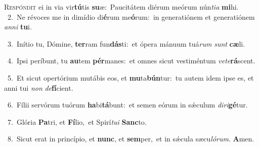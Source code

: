 \lettrine{\initial\textcolor{\initialcolor}{R}}{espóndit} ei in via vir\-\textbf{tú}\-tis \textbf{su}\-æ:~\star Paucitátem diérum meórum nún\-\textit{ti}\-\textit{a} \textbf{mi}\-hi.\\
{\numbfont\textcolor{\numbcolor}{~2.}}~Ne révoces me in dimídio di\-\textbf{é}\-rum me\-\textbf{ó}\-rum:~\star in generatiónem et generatiónem \textit{an}\-\textit{ni} \textbf{tu}\-i.\par
{\numbfont\textcolor{\numbcolor}{~3.}}~Inítio tu, Dómine, \textbf{ter}\-ram fun\-\textbf{dás}\-ti:~\star et ópera mánuum tuá\textit{rum} \textit{sunt} \textbf{cæ}\-li.\par
{\numbfont\textcolor{\numbcolor}{~4.}}~Ipsi períbunt, tu \textbf{au}\-tem \textbf{pér}\-manes:~\star et omnes sicut vestiméntum \textit{ve}\-\textit{te}\textbf{rá}scent.\par
{\numbfont\textcolor{\numbcolor}{~5.}}~Et sicut opertórium mutábis eos, et \textbf{mu}\-ta\-\textbf{bún}\-tur:~\star tu autem idem ipse es, et anni tui \textit{non} \textit{de}\-\textbf{fí}cient.\par
{\numbfont\textcolor{\numbcolor}{~6.}}~Fílii servórum tuórum \textbf{ha}\-bi\-\textbf{tá}\-bunt:~\star et semen eórum in sǽculum \textit{di}\-\textit{ri}\textbf{gé}tur.\par
{\numbfont\textcolor{\numbcolor}{~7.}}~Glória \textbf{Pa}\-tri, et \textbf{Fí}\-lio,~\star et Spirí\-\textit{tu}\-\textit{i} \textbf{Sanc}\-to.\par
{\numbfont\textcolor{\numbcolor}{~8.}}~Sicut erat in princípio, et \textbf{nunc}\-, et \textbf{sem}\-per,~\star et in sǽcula sæcu\-\textit{ló}\-\textit{rum}. \textbf{A}\-men.\par
